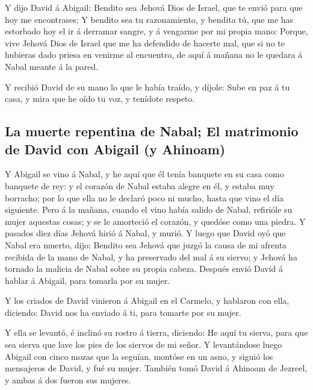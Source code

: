  Y dijo David á Abigail: Bendito sea Jehová Dios de Israel,
que te envió para que hoy me encontrases;  Y bendito sea tu
razonamiento, y bendita tú, que me has estorbado hoy el ir á derramar
sangre, y á vengarme por mi propia mano:  Porque, vive
Jehová Dios de Israel que me ha defendido de hacerte mal, que si no te
hubieras dado priesa en venirme al encuentro, de aquí á mañana no le
quedara á Nabal meante á la pared.

 Y recibió David de su mano lo que le había traído, y
díjole: Sube en paz á tu casa, y mira que he oído tu voz, y tenídote
respeto.

\hypertarget{la-muerte-repentina-de-nabal-el-matrimonio-de-david-con-abigail-y-ahinoam}{%
\subsection{La muerte repentina de Nabal; El matrimonio de David con
Abigail (y
Ahinoam)}\label{la-muerte-repentina-de-nabal-el-matrimonio-de-david-con-abigail-y-ahinoam}}

 Y Abigail se vino á Nabal, y he aquí que él tenía banquete
en su casa como banquete de rey: y el corazón de Nabal estaba alegre en
él, y estaba muy borracho; por lo que ella no le declaró poco ni mucho,
hasta que vino el día siguiente.  Pero á la mañana, cuando
el vino había salido de Nabal, refirióle su mujer aquestas cosas; y se
le amorteció el corazón, y quedóse como una piedra.  Y
pasados diez días Jehová hirió á Nabal, y murió.  Y luego
que David oyó que Nabal era muerto, dijo: Bendito sea Jehová que juzgó
la causa de mi afrenta recibida de la mano de Nabal, y ha preservado del
mal á su siervo; y Jehová ha tornado la malicia de Nabal sobre su propia
cabeza. Después envió David á hablar á Abigail, para tomarla por su
mujer.

 Y los criados de David vinieron á Abigail en el Carmelo, y
hablaron con ella, diciendo: David nos ha enviado á ti, para tomarte por
su mujer.

 Y ella se levantó, é inclinó su rostro á tierra, diciendo:
He aquí tu sierva, para que sea sierva que lave los pies de los siervos
de mi señor.  Y levantándose luego Abigail con cinco mozas
que la seguían, montóse en un asno, y siguió los mensajeros de David, y
fué su mujer.  También tomó David á Ahinoam de Jezreel, y
ambas á dos fueron sus mujeres.


